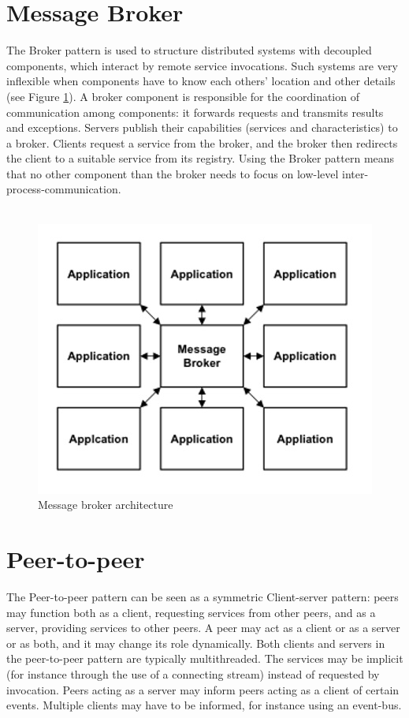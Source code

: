 \documentclass{article}
\begin{document}
\section{Message Broker}
The Broker pattern is used to structure distributed systems with decoupled components, which interact by remote service invocations. Such systems are very inflexible when components have to know each others' location and other details (see Figure \ref{fig_mbr}). A broker component is responsible for the coordination of communication among components: it forwards requests and transmits results and exceptions. Servers publish their capabilities (services and characteristics) to a broker. Clients request a service from the broker, and the broker then redirects the client to a suitable service from its registry. Using the Broker pattern means that no other component than the broker needs to focus on low-level inter-process-communication.\\\\


\begin{figure}[h]
\centering
\includegraphics[scale=0.8]{mbr.jpg}
\caption{Message broker architecture}
\label{fig_mbr}
\end{figure}
\newpage



\section{Peer-to-peer}
The Peer-to-peer pattern can be seen as a symmetric Client-server pattern: peers may function both as a client, requesting services from other peers, and as a server, providing services to other peers. A peer may act as a client or as a server or as both, and it may change its role dynamically. Both clients and servers in the peer-to-peer pattern are typically multithreaded. The services may be implicit (for instance through the use of a connecting stream) instead of requested by invocation. Peers acting as a server may inform peers acting as a client of certain events. Multiple clients may have to be informed, for instance using an event-bus.\\\\
\end{document}

